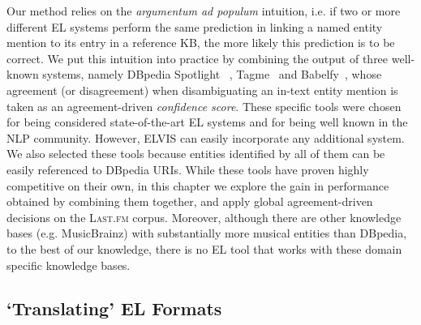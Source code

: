 Our method relies on the \textit{argumentum ad populum} intuition, i.e. if two or more different EL systems perform the same prediction in linking a named entity mention to its entry in a reference KB, the more likely this prediction is to be correct. We put this intuition into practice by combining the output of three well-known systems, namely DBpedia Spotlight~\cite{Mendes2011} , Tagme~\cite{Ferragina2012} and Babelfy~\cite{Moroetal2014b}, whose agreement (or disagreement) when disambiguating an in-text entity mention is taken as an agreement-driven \textit{confidence score}. These specific tools were chosen for being considered state-of-the-art EL systems and for being well known in the NLP community. However, \textsc{ELVIS} can easily incorporate any additional system. We also selected these tools because entities identified by all of them can be easily referenced to DBpedia URIs. 
While these tools have proven highly competitive on their own, in this chapter we explore the gain in performance obtained by combining them together, and apply global agreement-driven decisions on the \textsc{Last.fm} corpus.
Moreover, although there are other knowledge bases (e.g. MusicBrainz) with substantially more musical entities than DBpedia, to the best of our knowledge, there is no EL tool that works with these domain specific knowledge bases. 




\subsection{`Translating' EL Formats}
\label{sec:unification}


